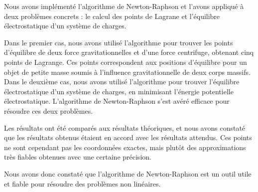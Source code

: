 \documentclass{article}
\begin{document}
Nous avons implémenté l'algorithme de Newton-Raphson et l'avons appliqué à deux problèmes concrets : le calcul des points de Lagrane et l'équilibre électrostatique d'un système de charges.

Dans le premier cas, nous avons utilisé l'algorithme pour trouver les points d'équilibre de deux force gravitationnelles et d'une force centrifuge, obtenant cinq points de Lagrange. Ces points correspondent aux positions d'équilibre pour un objet de petite masse soumis à l'influence gravitationnelle de deux corps massifs. Dans le deuxième cas, nous avons utilisé l'algorithme pour trouver l'équilibre électrostatique d'un système de charges, en minimisant l'énergie potentielle électrostatique. L'algorithme de Newton-Raphson s'est avéré efficace pour résoudre ces deux problèmes.

Les résultats ont été comparés aux résultats théoriques, et nous avons constaté que les résultats obtenus étaient en accord avec les résultats attendus. Ces points ne sont cependant pas les coordonnées exactes, mais plutôt des approximations très fiables obtenues avec une certaine précision.

Nous avons donc constaté que l'algorithme de Newton-Raphson est un outil utile et fiable pour résoudre des problèmes non linéaires.
\end{document}
